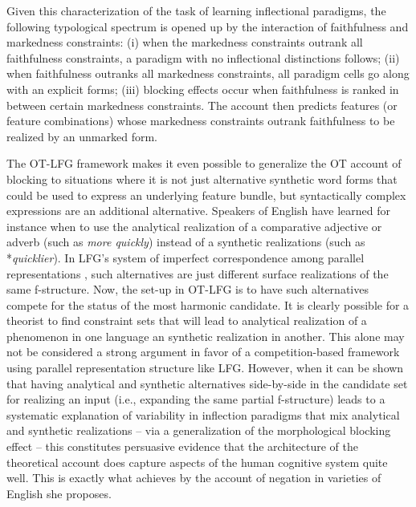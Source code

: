 \documentclass[output=paper,hidelinks]{langscibook}
\begin{document}
Given this characterization of the task of learning inflectional paradigms, 
the following typological spectrum is opened up by the interaction of faithfulness and markedness constraints: (i) when the markedness constraints outrank all faithfulness constraints, a paradigm with no inflectional distinctions follows; (ii) when faithfulness outranks all markedness constraints, all paradigm cells go along with an explicit forms; (iii) blocking effects occur when faithfulness is ranked in between certain markedness constraints. The account then predicts features (or feature combinations) whose markedness constraints outrank faithfulness to be realized by an unmarked form.

The OT-LFG framework makes it even possible to generalize the OT account of blocking to situations where it is not just alternative synthetic word forms that could be used to express an underlying feature bundle, but syntactically complex expressions are an additional alternative. Speakers of English have learned for instance when to use the analytical realization of a comparative adjective or adverb (such as \emph{more quickly}) instead of a synthetic realizations (such as *\emph{quicklier}).
In LFG's system of imperfect correspondence among parallel representations \citep{bresnan2001lexical}, such alternatives are just different surface realizations of the same f-structure. Now, the set-up in OT-LFG is to have such alternatives compete for the status of the most harmonic candidate. It is clearly possible for a theorist to find constraint sets that will lead to analytical realization of a phenomenon in one language an synthetic realization in another. This alone may not be considered a strong argument in favor of a competition-based framework using parallel representation structure like LFG. However, when it can be shown that having analytical and synthetic alternatives side-by-side in the candidate set for realizing an input (i.e., expanding the same partial f-structure) leads to a systematic explanation of variability in inflection paradigms that mix analytical and synthetic realizations -- via a generalization of the morphological blocking effect -- this constitutes persuasive evidence that the architecture of the theoretical account does capture aspects of the human cognitive system quite well. This is exactly what \citet{Bresnan-Explaining-Morphosyntactic}  achieves by the account of negation in varieties of English she proposes. 
\end{document}
